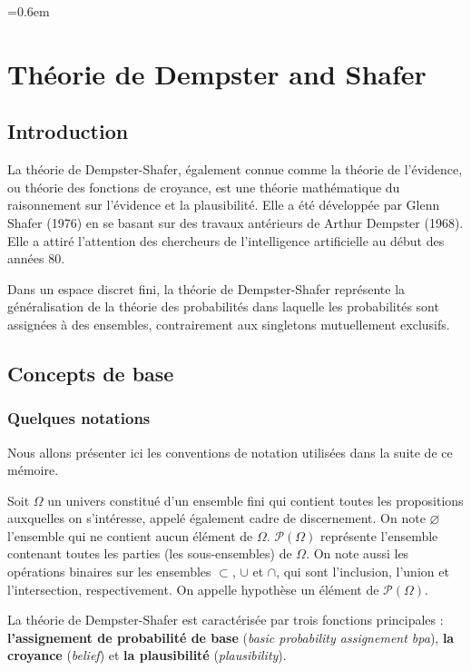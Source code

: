 \parskip=0.6em
\chapter{Théorie de Dempster and Shafer}

{}
\section*{Introduction}

La théorie de Dempster-Shafer, également connue comme la théorie de l'évidence,
ou théorie des fonctions de croyance, est une théorie mathématique du raisonnement
sur l’évidence et la plausibilité. Elle a été développée par Glenn Shafer (1976)
en se basant sur des travaux antérieurs de Arthur Dempster (1968). Elle a attiré
l’attention des chercheurs de l'intelligence artificielle au début des années 80.

Dans un espace discret fini, la théorie de Dempster-Shafer représente la généralisation
de la théorie des probabilités dans laquelle les probabilités sont assignées à des ensembles,
contrairement aux singletons mutuellement exclusifs.

\section{Concepts de base}

\subsection{Quelques notations}

Nous allons présenter ici les conventions de notation utilisées dans la suite de ce mémoire.

Soit $\Omega$ un univers constitué d'un ensemble fini qui contient toutes les propositions
auxquelles on s'intéresse, appelé également cadre de discernement. On note $\varnothing$
l’ensemble qui ne contient aucun élément de $\Omega$. $\mathcal{P}(\Omega)$ représente
l’ensemble contenant toutes les parties (les sous-ensembles) de $\Omega$. On note aussi
les opérations binaires sur les ensembles $\subset$, $\cup$ et $\cap$, qui sont l’inclusion,
l’union et l’intersection, respectivement. On appelle hypothèse un élément de $\mathcal{P}(\Omega)$.

La théorie de Dempster-Shafer est caractérisée par trois fonctions principales :
\textbf{l’assignement de probabilité de base} (\emph{basic probability assignement bpa}),
\textbf{la croyance} (\emph{belief}) et \textbf{la plausibilité} (\emph{plausibility}).

